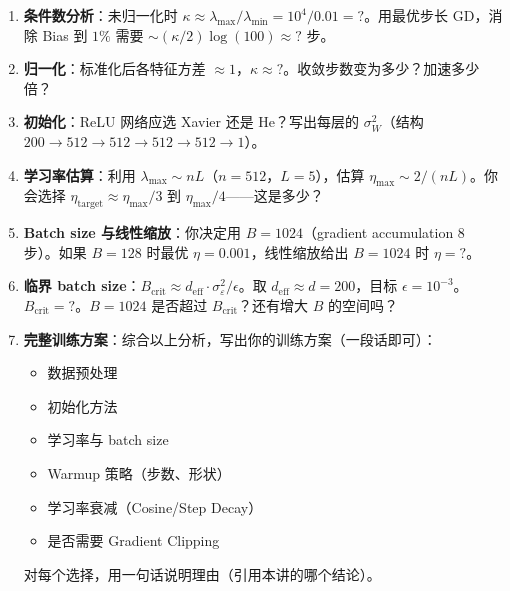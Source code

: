 \documentclass[12pt, a4paper]{ctexart}
\begin{document}
\begin{enumerate}
    \item[(a)] \textbf{条件数分析}：未归一化时 $\kappa \approx \lambda_{\max}/\lambda_{\min} = 10^4/0.01 = ?$。用最优步长 GD，消除 Bias 到 $1\%$ 需要 $\sim (\kappa/2)\log(100) \approx ?$ 步。
    
    \item[(b)] \textbf{归一化}：标准化后各特征方差 $\approx 1$，$\kappa \approx ?$。收敛步数变为多少？加速多少倍？
    
    \item[(c)] \textbf{初始化}：ReLU 网络应选 Xavier 还是 He？写出每层的 $\sigma_W^2$（结构 $200 \to 512 \to 512 \to 512 \to 512 \to 1$）。
    
    \item[(d)] \textbf{学习率估算}：利用 $\lambda_{\max} \sim nL$（$n = 512$，$L = 5$），估算 $\eta_{\max} \sim 2/(nL)$。你会选择 $\eta_{\text{target}} \approx \eta_{\max}/3$ 到 $\eta_{\max}/4$——这是多少？
    
    \item[(e)] \textbf{Batch size 与线性缩放}：你决定用 $B = 1024$（gradient accumulation 8 步）。如果 $B = 128$ 时最优 $\eta = 0.001$，线性缩放给出 $B = 1024$ 时 $\eta = ?$。
    
    \item[(f)] \textbf{临界 batch size}：$B_{\text{crit}} \approx d_{\text{eff}} \cdot \sigma_\varepsilon^2/\epsilon$。取 $d_{\text{eff}} \approx d = 200$，目标 $\epsilon = 10^{-3}$。$B_{\text{crit}} = ?$。$B = 1024$ 是否超过 $B_{\text{crit}}$？还有增大 $B$ 的空间吗？
    
    \item[(g)] \textbf{完整训练方案}：综合以上分析，写出你的训练方案（一段话即可）：
    \begin{itemize}
        \item 数据预处理
        \item 初始化方法
        \item 学习率与 batch size
        \item Warmup 策略（步数、形状）
        \item 学习率衰减（Cosine/Step Decay）
        \item 是否需要 Gradient Clipping
    \end{itemize}
    对每个选择，用一句话说明理由（引用本讲的哪个结论）。
\end{enumerate}
\end{document}
